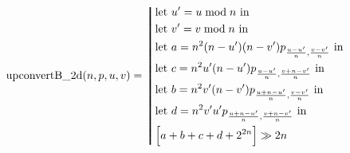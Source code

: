 \begin{equation*}
\text{upconvertB\_2d}(n,p,u,v) =
  \left\bracevert\begin{aligned}
    &\text{let } u' = u \bmod n \text{ in} \\
    &\text{let } v' = v \bmod n \text{ in} \\
    &\text{let } a = n^2 (n-u')(n-v')  p_{\frac{u-u'}{n},\frac{v-v'}{n}} \text{ in} \\
    &\text{let } c = n^2 u'(n-u')  p_{\frac{u-u'}{n},\frac{v+n-v'}{n}} \text{ in} \\
    &\text{let } b = n^2 v'(n-v')  p_{\frac{u+n-u'}{n},\frac{v-v'}{n}} \text{ in} \\
    &\text{let } d = n^2 v'u'  p_{\frac{u+n-u'}{n},\frac{v+n-v'}{n}} \text{ in} \\
    &\Bigl[ a + b + c + d + 2^{2n} \Bigr] \gg 2n
    \end{aligned}\right.
\end{equation*}

